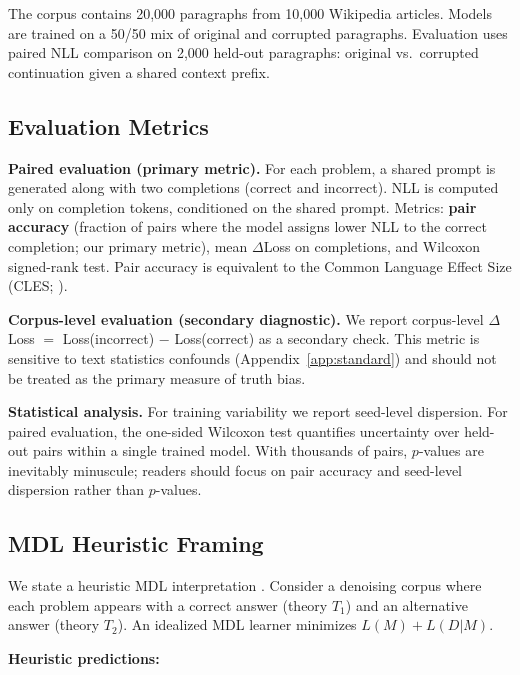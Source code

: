\documentclass[10pt]{article} %
\begin{document}
The corpus contains 20,000 paragraphs from 10,000 Wikipedia articles. Models are trained on a 50/50 mix of original and corrupted paragraphs. Evaluation uses paired NLL comparison on 2,000 held-out paragraphs: original vs.\ corrupted continuation given a shared context prefix.

\subsection{Evaluation Metrics}
\label{sec:eval}

\textbf{Paired evaluation (primary metric).} For each problem, a shared prompt is generated along with two completions (correct and incorrect). NLL is computed only on completion tokens, conditioned on the shared prompt. Metrics: \textbf{pair accuracy} (fraction of pairs where the model assigns lower NLL to the correct completion; our primary metric), mean $\Delta$Loss on completions, and Wilcoxon signed-rank test. Pair accuracy is equivalent to the Common Language Effect Size (CLES; \citealp{mcgraw1992common}).

\textbf{Corpus-level evaluation (secondary diagnostic).} We report corpus-level $\Delta$Loss $=$ Loss(incorrect) $-$ Loss(correct) as a secondary check. This metric is sensitive to text statistics confounds (Appendix~\ref{app:standard}) and should not be treated as the primary measure of truth bias.

\textbf{Statistical analysis.} For training variability we report seed-level dispersion. For paired evaluation, the one-sided Wilcoxon test quantifies uncertainty over held-out pairs within a single trained model. With thousands of pairs, $p$-values are inevitably minuscule; readers should focus on pair accuracy and seed-level dispersion rather than $p$-values.

\subsection{MDL Heuristic Framing}
\label{sec:mdl}

We state a heuristic MDL interpretation \citep{rissanen1978modeling,grunwald2007minimum}. Consider a denoising corpus where each problem appears with a correct answer (theory $T_1$) and an alternative answer (theory $T_2$). An idealized MDL learner minimizes $L(M) + L(D|M)$.

\textbf{Heuristic predictions:}
\end{document}
